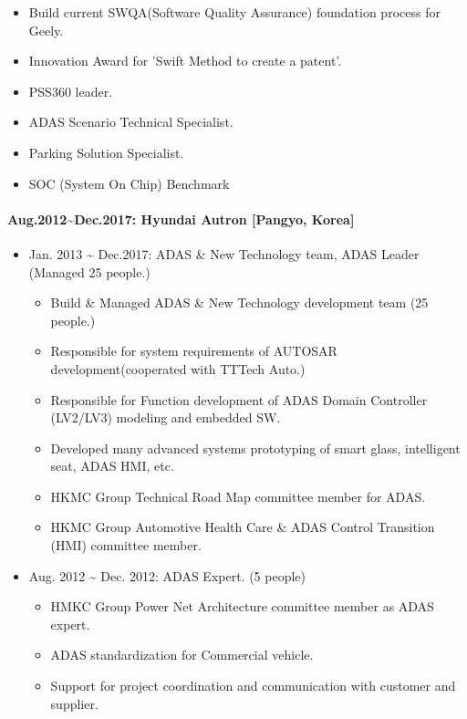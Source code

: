 \documentclass[12pt,a4paper]{article}
\begin{document}
\begin{itemize}
\begin{itemize}
\item Build current SWQA(Software Quality Assurance) foundation process for Geely.


\item Innovation Award for 'Swift Method to create a patent'.


\item PSS360 leader.


\item ADAS Scenario Technical Specialist.


\item Parking Solution Specialist.


\item SOC (System On Chip) Benchmark

\end{itemize}
\end{itemize}
\paragraph{Aug.2012{\textasciitilde}Dec.2017: Hyundai Autron [Pangyo, Korea]}
\begin{itemize}
\item Jan. 2013 {\textasciitilde} Dec.2017: ADAS \& New Technology team, ADAS Leader (Managed 25 people.)

\begin{itemize}
\item Build \& Managed ADAS \& New Technology development team (25 people.)


\item Responsible for system requirements of AUTOSAR development(cooperated with TTTech Auto.)


\item Responsible for Function development of ADAS Domain Controller (LV2/LV3) modeling and embedded SW.


\item Developed many advanced systems prototyping of smart glass, intelligent seat, ADAS HMI, etc.


\item HKMC Group Technical Road Map committee member for ADAS.


\item HKMC Group Automotive Health Care \& ADAS Control Transition (HMI) committee member.

\end{itemize}

\item Aug. 2012 {\textasciitilde} Dec. 2012: ADAS Expert. (5 people)

\begin{itemize}
\item HMKC Group Power Net Architecture committee member as ADAS expert.


\item ADAS standardization for Commercial vehicle.


\item Support for project coordination and communication with customer and supplier.

\end{itemize}
\end{itemize}
\end{document}
